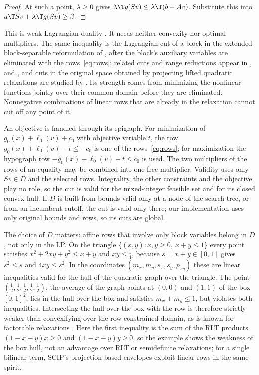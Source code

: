 \begin{proof}
At such a point, $\lambda\ge0$ gives $\lambda\T g(Sv)\le\lambda\T(b-Av)$.
Substitute this into $a\T Sv+\lambda\T g(Sv)\ge\beta$.
\end{proof}

This is weak Lagrangian duality
\citep[Sections~5.1.3 and~5.2.2]{BoydVandenberghe2004}. It needs neither
convexity nor optimal multipliers. The same inequality is the Lagrangian
cut of a block in the extended block-separable reformulation of
\citet[Section~7.1]{Nowak2005}, after the block's auxiliary variables are
eliminated with the rows~\eqref{eq:rows}; related cuts and range reductions
appear in \citet{TawarmalaniSahinidis2004}, \citet{KaruppiahGrossmann2008}
and \citet{DomesNeumaier2016}, and cuts in the original space obtained by
projecting lifted quadratic relaxations are studied by
\citet{SaxenaBonamiLee2011}. Its strength comes from minimizing the
nonlinear functions jointly over their common domain before they are
eliminated. Nonnegative combinations of linear rows that are already in the
relaxation cannot cut off any point of it.

An objective is handled through its epigraph. For minimization of
$g_0(x)+\ell_0(v)+c_0$ with objective variable $t$, the row
$g_0(x)+\ell_0(v)-t\le-c_0$ is one of the rows~\eqref{eq:rows}; for
maximization the hypograph row $-g_0(x)-\ell_0(v)+t\le c_0$ is used. The two
multipliers of the rows of an equality may be combined into one free
multiplier. Validity uses only $Sv\in D$ and the selected rows. Integrality,
the other constraints and the objective play no role, so the cut is valid
for the mixed-integer feasible set and for its closed convex hull. If $D$ is
built from bounds valid only at a node of the search tree, or from an
incumbent cutoff, the cut is valid only there; our implementation uses only
original bounds and rows, so its cuts are global.

The choice of $D$ matters: affine rows that involve only block variables
belong in $D$, not only in the LP. On the triangle $\{(x,y):x,y\ge0,\ x+y\le1\}$
every point satisfies $x^2+2xy+y^2\le x+y$ and $xy\le\tfrac14$, because
$s=x+y\in[0,1]$ gives $s^2\le s$ and $4xy\le s^2$. In the coordinates
$(m_x,m_y,s_x,s_y,p_{xy})$ these are linear inequalities valid for the hull
of the quadratic graph over the triangle. The point
$(\tfrac12,\tfrac12,\tfrac12,\tfrac12,\tfrac12)$, the average of the graph points
at $(0,0)$ and $(1,1)$ of the box $[0,1]^2$, lies in the hull over the box and
satisfies $m_x+m_y\le1$, but violates both inequalities. Intersecting the
hull over the box with the row is therefore strictly weaker than
convexifying over the row-constrained domain, as is known for factorable
relaxations \citep{Anstreicher2012,ZhuHeTawarmalani2026,WuMutsNowakHendrix2025}.
Here the first inequality is the sum of the RLT products $(1-x-y)x\ge0$ and
$(1-x-y)y\ge0$, so the example shows the weakness of the box hull, not an
advantage over RLT or semidefinite relaxations; for a single bilinear term,
SCIP's projection-based envelopes \citep{MullerSerranoGleixner2020} exploit
linear rows in the same spirit.

